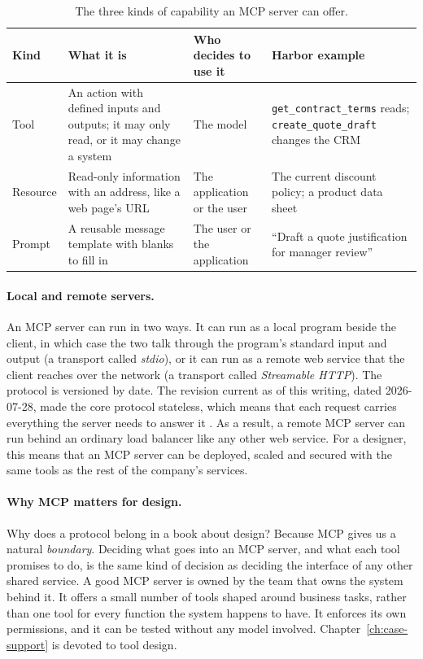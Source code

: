 \begin{table}[htbp]
\centering
\small
\caption{The three kinds of capability an MCP server can offer.}
\label{tab:mcp-kinds}
\begin{tabularx}{\textwidth}{@{}>{\raggedright\arraybackslash}p{1.9cm}>{\raggedright\arraybackslash}X>{\raggedright\arraybackslash}p{3.0cm}>{\raggedright\arraybackslash}X@{}}
\toprule
\rowcolor{coGreenBg} Kind & What it is & Who decides to use it & Harbor example \\
\midrule
Tool & An action with defined inputs and outputs; it may only read, or it may change a system & The model & \texttt{get\_contract\_terms} reads; \texttt{create\_quote\_draft} changes the CRM \\
Resource & Read-only information with an address, like a web page's URL & The application or the user & The current discount policy; a product data sheet \\
Prompt & A reusable message template with blanks to fill in & The user or the application & ``Draft a quote justification for manager review'' \\
\bottomrule
\end{tabularx}
\end{table}

\paragraph{Local and remote servers.} An MCP server can run in two ways. It can run as a local program beside the client, in which case the two talk through the program's standard input and output (a transport called \emph{stdio}), or it can run as a remote web service that the client reaches over the network (a transport called \emph{Streamable HTTP}). The protocol is versioned by date. The revision current as of this writing, dated 2026-07-28, made the core protocol stateless, which means that each request carries everything the server needs to answer it \citep{mcp2026spec}. As a result, a remote MCP server can run behind an ordinary load balancer like any other web service. For a designer, this means that an MCP server can be deployed, scaled and secured with the same tools as the rest of the company's services.

\paragraph{Why MCP matters for design.} Why does a protocol belong in a book about design? Because MCP gives us a natural \emph{boundary}. Deciding what goes into an MCP server, and what each tool promises to do, is the same kind of decision as deciding the interface of any other shared service. A good MCP server is owned by the team that owns the system behind it. It offers a small number of tools shaped around business tasks, rather than one tool for every function the system happens to have. It enforces its own permissions, and it can be tested without any model involved. Chapter~\ref{ch:case-support} is devoted to tool design.


